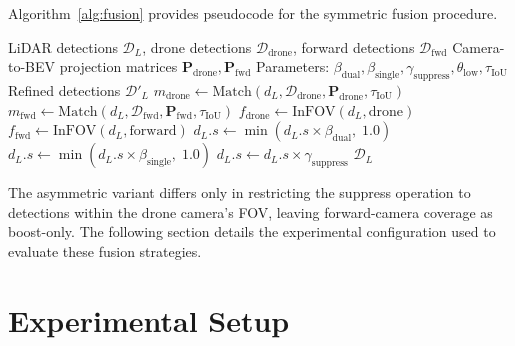 \documentclass[sustainability,article,submit,moreauthors,pdftex]{Definitions/mdpi}
\begin{document}
Algorithm~\ref{alg:fusion} provides pseudocode for the symmetric fusion procedure.

\begin{algorithm}[H]
\caption{Symmetric Dual-Camera LiDAR Fusion}\label{alg:fusion}
\begin{algorithmic}[1]
\Require LiDAR detections $\mathcal{D}_L$, drone detections $\mathcal{D}_{\mathrm{drone}}$, forward detections $\mathcal{D}_{\mathrm{fwd}}$
\Require Camera-to-BEV projection matrices $\mathbf{P}_{\mathrm{drone}}, \mathbf{P}_{\mathrm{fwd}}$
\Require Parameters: $\beta_{\mathrm{dual}}, \beta_{\mathrm{single}}, \gamma_{\mathrm{suppress}}, \theta_{\mathrm{low}}, \tau_{\mathrm{IoU}}$
\Ensure Refined detections $\mathcal{D}'_L$
    \State $m_{\mathrm{drone}} \gets \text{Match}(d_L, \mathcal{D}_{\mathrm{drone}}, \mathbf{P}_{\mathrm{drone}}, \tau_{\mathrm{IoU}})$
    \State $m_{\mathrm{fwd}} \gets \text{Match}(d_L, \mathcal{D}_{\mathrm{fwd}}, \mathbf{P}_{\mathrm{fwd}}, \tau_{\mathrm{IoU}})$
    \State $f_{\mathrm{drone}} \gets \text{InFOV}(d_L, \text{drone})$
    \State $f_{\mathrm{fwd}} \gets \text{InFOV}(d_L, \text{forward})$
        \State $d_L.s \gets \min(d_L.s \times \beta_{\mathrm{dual}},\; 1.0)$
        \State $d_L.s \gets \min(d_L.s \times \beta_{\mathrm{single}},\; 1.0)$
        \State $d_L.s \gets d_L.s \times \gamma_{\mathrm{suppress}}$
    \EndIf
\EndFor
\State \Return $\mathcal{D}_L$
\end{algorithmic}
\end{algorithm}

\noindent The asymmetric variant differs only in restricting the suppress operation to detections within the drone camera's FOV, leaving forward-camera coverage as boost-only. The following section details the experimental configuration used to evaluate these fusion strategies.

\section{Experimental Setup}\label{sec:experiments}
\end{document}
